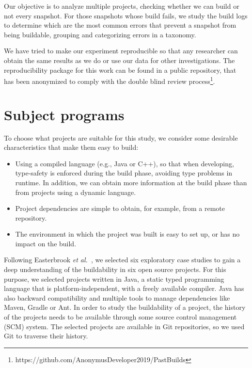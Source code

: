 Our objective is to analyze multiple projects, checking whether we can build  or not every snapshot.
For those snapshots whose build fails, we study the build logs to determine which are the most common errors that prevent a snapshot from being buildable, grouping and categorizing errors in a taxonomy.

 
We have tried to make our experiment reproducible so that any researcher can obtain the same results as we do or use our data for other investigations.
The reproducibility package for this work can be found in a public repository, that has been anonymized to comply with the double blind review process\footnote{https://github.com/AnonymusDeveloper2019/PastBuilds}.


\section{Subject programs}

To choose what projects are suitable for this study, we consider some desirable characteristics that make them easy to build:

\begin{itemize}
	\item Using a compiled language (e.g., Java or C++), so that when developing, type-safety is enforced during the build phase, avoiding type problems in runtime.
In addition, we can obtain more information at the build phase than from projects using a dynamic language.
	\item Project dependencies are simple to obtain, for example, from a remote repository.
	\item The environment in which the project was built is easy to set up, or has no impact on the build.
\end{itemize}

Following Easterbrook \emph{et al.}~\cite{easterbrook2008selecting}, we selected six exploratory case studies to gain a deep understanding of the buildability in six open source projects.
For this purpose, we selected projects written in Java, a static typed programming language that is platform-independent, with a freely available compiler.
Java has also backward compatibility and multiple tools to manage dependencies like Maven, Gradle or Ant.
In order to study the buildability of a project, the history of the projects needs to be available through some source control management (SCM) system.
The selected projects are available in Git repositories, so we used Git to traverse their history.

